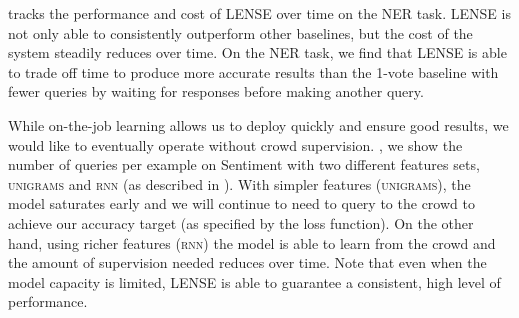  tracks the performance and cost of LENSE over time on the NER task.
LENSE is not only able  to consistently outperform other baselines, but the cost of the system steadily reduces over time.
On the NER task, we find that LENSE is able to trade off time to produce more
accurate results than the 1-vote baseline with fewer queries by waiting for
responses before making another query.




While on-the-job learning allows us to deploy quickly and ensure good results, we would like to eventually operate without crowd supervision.
, we show the number of queries per example on Sentiment with two different features sets, \textsc{unigrams} and \textsc{rnn} (as described in ).
With simpler features (\textsc{unigrams}),
the model saturates early and we will continue to need to query to the crowd to achieve our accuracy target (as specified by the loss function).
On the other hand, using richer features (\textsc{rnn}) the model is able to learn from the crowd and the amount of supervision needed reduces over time.
Note that even when the model capacity is limited, LENSE is able to guarantee a consistent, high level of performance.

